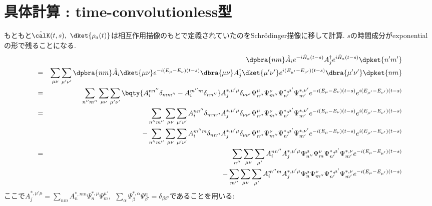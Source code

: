 \documentclass[10.5pt,a4paper]{jreport}
\begin{document}
\section{具体計算 : time-convolutionless型}
もともと$\hat{\calK}(t, s),\ \dket{\rho_a(t)}$は相互作用描像のもとで定義されていたのをSchr\"odinger描像に移して計算. $s$の時間成分がexponentialの形で残ることになる.
\begin{eqnarray}
  \nonumber &&\dpbra{nm}\hat{A}_ie^{-i\hat{H}_a(t-s)}A_j^\dagger e^{i\hat{H}_a(t-s)}\dpket{n'm'}\\
  &=& \sum_{\mu\nu}\sum_{\mu'\nu'}\dpbra{nm}\hat{A}_i\dket{\mu\nu}e^{-i(E_\mu - E_\nu)(t-s)}\dbra{\mu\nu}A_j^\dagger \dket{\mu'\nu'}e^{i(E_{\mu'} - E_{\nu'})(t-s)}\dbra{\mu'\nu'}\dpket{nm}\\
  \nonumber &=& \sum_{n''m''}\sum_{\mu\nu}\sum_{\mu'\nu'}\bqty{A_i^{nn''}\delta_{mm''} - A_i^{m''m}\delta_{nn''}}A_j^{*, \mu'\mu}\delta_{\nu\nu'}\Psi_{n''}^{\mu}\Psi_{m''}^{\nu}\Psi_{n'}^{*, \mu'}\Psi_{m'}^{*, \nu'}e^{-i(E_\mu - E_\nu)(t-s)}e^{i(E_{\mu'} - E_{\nu'})(t-s)}\\
  \nonumber &=&\sum_{n''m''}\sum_{\mu\nu}\sum_{\mu'\nu'}A_i^{nn''}\delta_{mm''}A_j^{*, \mu'\mu}\delta_{\nu\nu'}\Psi_{n''}^{\mu}\Psi_{m''}^{\nu}\Psi_{n'}^{*, \mu'}\Psi_{m'}^{*, \nu'}e^{-i(E_\mu - E_\nu)(t-s)}e^{i(E_{\mu'} - E_{\nu'})(t-s)}\\
  &&- \sum_{n''m''}\sum_{\mu\nu}\sum_{\mu'\nu'}A_i^{m''m}\delta_{nn''}A_j^{*, \mu'\mu}\delta_{\nu\nu'}\Psi_{n''}^{\mu}\Psi_{m''}^{\nu}\Psi_{n'}^{*, \mu'}\Psi_{m'}^{*, \nu'}e^{-i(E_\mu - E_\nu)(t-s)}e^{i(E_{\mu'} - E_{\nu'})(t-s)}\\
  \nonumber &=&\sum_{n''}\sum_{\mu\nu}\sum_{\mu'}A_i^{nn''}A_j^{*, \mu'\mu}\Psi_{n''}^{\mu}\Psi_{m}^{\nu}\Psi_{n'}^{*, \mu'}\Psi_{m'}^{*, \nu}e^{-i(E_\mu - E_{\mu'})(t-s)}\\
  &&- \sum_{m''}\sum_{\mu\nu}\sum_{\mu'}A_i^{m''m}A_j^{*, \mu'\mu}\Psi_{n}^{\mu}\Psi_{m''}^{\nu}\Psi_{n'}^{*, \mu'}\Psi_{m'}^{*, \nu}e^{-i(E_\mu - E_{\mu'})(t-s)}\label{mid}
\end{eqnarray}
ここで$A_j^{*,\mu'\mu} = \sum_{nm}A^{*, mn}_n\Psi_n^{*, \mu}\Psi_m^{\mu'},\ \ \sum_\alpha \Psi_\beta^{*, \alpha}\Psi_{\beta'}^\alpha = \delta_{\beta\beta'}$であることを用いる:
\end{document}
